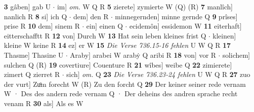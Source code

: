 \documentclass[8pt,a4paper,notitlepage]{article}
\begin{document}
\begin{table}[ht]
\begin{minipage}[t]{0.5\linewidth}
\textbf{3} gâben] gab U  $\cdot$ im] \textit{om.} W Q R \textbf{5} zierete] zymierte W (Q) (R) \textbf{7} manlîch] nanlich R \textbf{8} si] ich Q  $\cdot$ dem] den R  $\cdot$ minnegernden] minne gernde Q \textbf{9} prîses] prise R \textbf{10} dem] sinem R  $\cdot$ ein] einen Q  $\cdot$ ecidemôn] essidemon W \textbf{11} eiterhaft] eitterschafftt R \textbf{12} von] Durch W \textbf{13} Hat sein leben kleines frist Q  $\cdot$ kleinen] kleine W keine R \textbf{14} ez] er W \textbf{15} \textit{Die Verse 736.15-16 fehlen} U W Q R  \textbf{17} Thasme] Thasine U  $\cdot$ Araby] arabei W arabẏ Q aribi R \textbf{18} von] vor R  $\cdot$ solichem] sulchen Q (R) \textbf{19} covertiure] Couenture R \textbf{21} wîbes] weibe Q \textbf{22} zimierete] zimert Q zierret R  $\cdot$ sich] \textit{om.} Q \textbf{23} \textit{Die Verse 736.23-24 fehlen} U W Q R  \textbf{27} zuo der vurt] Zuͦm forecht W (R) Zu den forcht Q \textbf{29} Der keiner seiner rede vernam W · Des des andern rede vernam Q · Der deheins des andren sprache recht venam R \textbf{30} als] Als es W \newline
\end{minipage}
\end{table}
\end{document}
